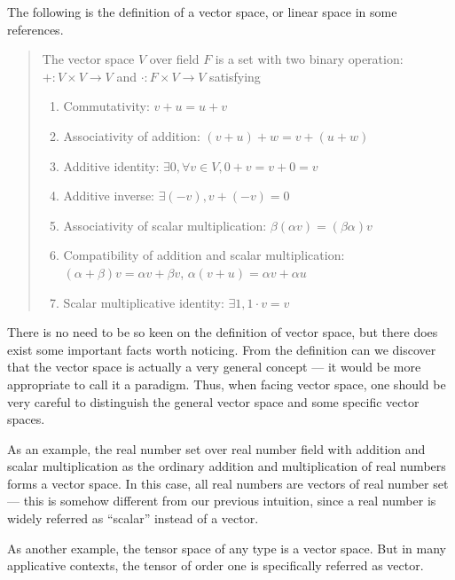 \documentclass[letterpaper,10pt,english]{sphinxmanual}
\begin{document}
The following is the definition of a vector space, or linear space in some references.
\begin{quote}

 The vector space \(V\) over field \(F\) is a set with two binary operation:  \(+:V\times V\rightarrow V\) and  \(\cdot:F\times V\rightarrow V\) satisfying
\begin{enumerate}
\item {} 
Commutativity: \(v+u=u+v\)

\item {} 
Associativity of addition: \((v+u)+w = v+(u+w)\)

\item {} 
Additive identity: \(\exists 0, \forall v\in V, 0+v=v+0=v\)

\item {} 
Additive inverse: \(\exists (-v), v + (-v) = 0\)

\item {} 
Associativity of scalar multiplication: \(\beta(\alpha v) = (\beta\alpha)v\)

\item {} 
Compatibility of addition and scalar multiplication: \((\alpha+\beta)v = \alpha v + \beta v\), \(\alpha(v+u) = \alpha v + \alpha u\)

\item {} 
Scalar multiplicative identity: \(\exists 1, 1\cdot v = v\)

\end{enumerate}
\end{quote}

There is no need to be so keen on the definition of vector space, but there does exist some important facts worth noticing. From the definition can we discover that the vector space is actually a very general concept --- it would be more appropriate to call it a paradigm. Thus, when facing vector space, one should be very careful to distinguish the general vector space and some specific vector spaces.

As an example, the real number set over real number field with addition and scalar multiplication as the ordinary addition and multiplication of real numbers forms a vector space. In this case, all real numbers are vectors of real number set --- this is somehow different from our previous intuition, since a real number is widely referred as ``scalar'' instead of a vector.

As another example, the tensor space of any type is a vector space. But in many applicative contexts, the tensor of order one is specifically referred as vector.
\end{document}
